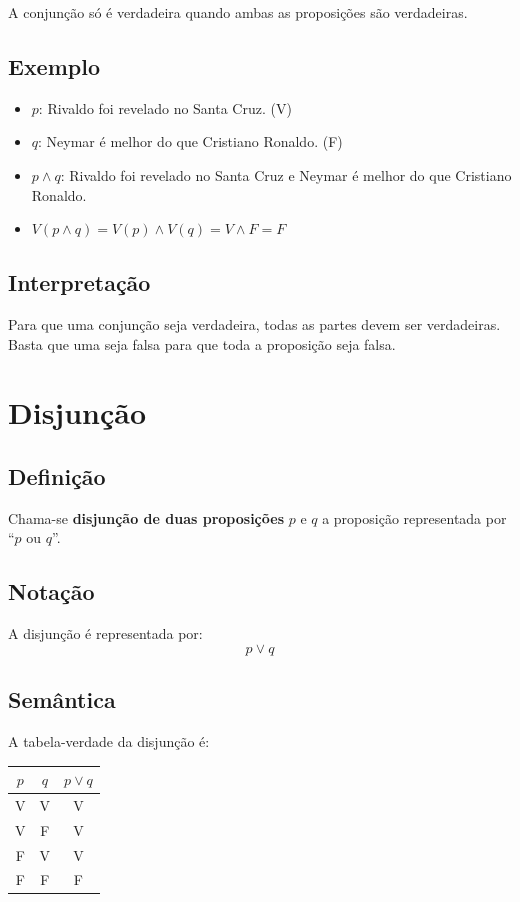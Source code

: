 A conjunção só é verdadeira quando ambas as proposições são verdadeiras.

\subsection{Exemplo}
\begin{itemize}
    \item $p$: Rivaldo foi revelado no Santa Cruz. \hspace*{0.5cm} (V)
    \item $q$: Neymar é melhor do que Cristiano Ronaldo. \hspace*{0.5cm} (F)

    \item $p \wedge q$: Rivaldo foi revelado no Santa Cruz e Neymar é melhor do que Cristiano Ronaldo.

    \item $V(p \wedge q) = V(p) \wedge V(q) = V \wedge F = F$
\end{itemize}

\subsection{Interpretação}
Para que uma conjunção seja verdadeira, todas as partes devem ser verdadeiras. Basta que uma seja falsa para que toda a proposição seja falsa.

\section{Disjunção}

\subsection{Definição}
Chama-se \textbf{disjunção de duas proposições} $p$ e $q$ a proposição representada por ``$p$ ou $q$''.

\subsection{Notação}
A disjunção é representada por:
\[
p \vee q
\]

\subsection{Semântica}
A tabela-verdade da disjunção é:

\begin{center}
\begin{tabular}{|cc|c|}
\hline
$p$ & $q$ & $p \vee q$ \\
\hline
V & V & V \\
V & F & V \\
F & V & V \\
F & F & F \\
\hline
\end{tabular}
\end{center}

